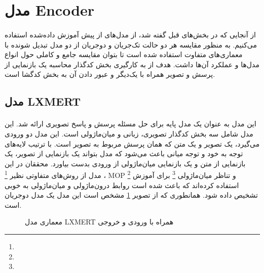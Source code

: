 \section {
  مدل Encoder
 }
\paragraph{}{
    از آنجایی که در بخش‌های قبل گفته شد، از مدل‌های از پیش آموزش داده‌شده 
    استفاده می‌کنیم. به منظور مقایسه هر دو حالت تک‌جریان و دوجریان از دو مدل
    تبدیل شونده با معماری‌های متفاوت استفاده شده است تا بتوان مقایسه جامع و
    کاملی حول انواع مدل‌ها و عملکرد آن‌ها داشت. هدف از به کارگیری 
    بخش کدگذار محاسبه یک بازنمایی از پرسش و تصویر همراه با یک‌دیگر و 
    عبور دادن آن به بخش کدگشا است.
}

\subsection {
  مدل LXMERT \cite{tan-bansal-2019-lxmert}
 }
\paragraph{}{
    این مدل به عنوان یک مدل پایه برای حل مسئله پرسش و پاسخ تصویری ارائه شد. 
    این مدل شامل سه بخش کدگذار تصویری، زبانی و میان‌ماژولی است. این مدل دو ورودی
    می‌گیرد، یک تصویر و یک متن که همان پرسش مربوط به تصویر است. با 
    ترتیب لایه‌های توجه به خود و توجه میانی باعث می‌شود که مدل بتواند 
    یک بازنمایی از تصویر، یک بازنمایی از متن و یک بازنمایی 
    میان‌ماژولی از ورودی‌ بدست بیاورد.  محققان در این مدل از روش‌های متفاوتی نظیر 
     \footnote{}
    ، MOP \footnote{}
    و
    تناظر میان‌ماژولی
    \footnote{}
    برای 
    آموزش استفاده کرده‌اند که باعث شده است روابط درون‌ماژولی
    و میان‌ماژولی به خوبی تشخیص داده شود. همانطوری که از تصویر 
    \ref{fig:lxmert}
    مشخص است این مدل یک مدل دوجریان است. 
    \begin{figure}[H]
        \caption{معماری مدل LXMERT همراه با ورودی و خروجی}
        \label{fig:lxmert}
    \end{figure}
}


